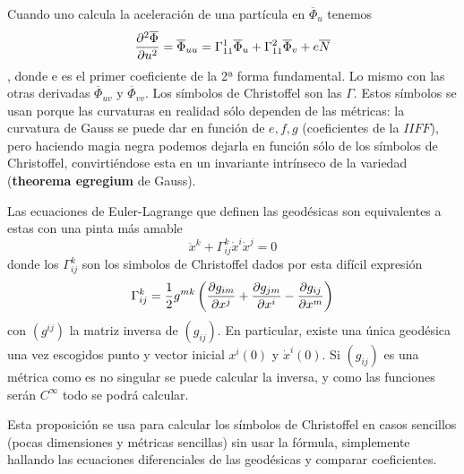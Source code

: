 \documentclass[palatino, bibnumbers]{apuntes}
\begin{document}
\indent Cuando uno calcula la aceleración de una partícula en $\overline{\Phi}_u$ tenemos $$\pdv[2]{\overline{\Phi}}{u}=\overline{\Phi}_{uu}=\Gamma^1_{11}\overline{\Phi}_u+\Gamma^2_{11}\overline{\Phi}_v+e\overline{N}$$, donde e es el primer coeficiente de la 2ª forma fundamental. Lo mismo con las otras derivadas $\overline{\Phi}_{uv}$ y $\overline{\Phi}_{vv}$. Los símbolos de Christoffel son las $\Gamma$. Estos símbolos se usan porque las curvaturas en realidad sólo dependen de las métricas: la curvatura de Gauss se puede dar en función de $e,f,g$ (coeficientes de la $II FF$), pero haciendo magia negra podemos dejarla en función sólo de los símbolos de Christoffel, convirtiéndose esta en un invariante intrínseco de la variedad (\textbf{theorema egregium} de Gauss).
\begin{prop}
Las ecuaciones de Euler-Lagrange que definen las geodésicas son equivalentes a estas con una pinta más amable
\begin{equation}
\ddot{x}^k+\Gamma^k_{ij}\dot{x}^i\dot{x}^j=0
\end{equation}
donde los $\Gamma^k_{ij}$ son los simbolos de Christoffel dados por esta difícil expresión
\begin{equation}
\Gamma^k_{ij}=\frac{1}{2}g^{mk}\left(\pdv{g_{im}}{x^j}+\pdv{g_{jm}}{x^i}-\pdv{g_{ij}}{x^m}\right)
\end{equation}
con $(g^{ij})$ la matriz inversa de $(g_{ij})$. En particular, existe una única geodésica una vez escogidos punto y vector inicial $x^i(0)$ y $\dot{x}^i(0)$. Si $(g_{ij})$ es una métrica como es no singular se puede calcular la inversa, y como las funciones serán $C^\infty$ todo se podrá calcular.
\end{prop}

\begin{obs} Esta proposición se usa para calcular los símbolos de Christoffel en casos sencillos (pocas dimensiones y métricas sencillas) sin usar la fórmula, simplemente hallando las ecuaciones diferenciales de las geodésicas y comparar coeficientes.
\end{obs}
\end{document}
